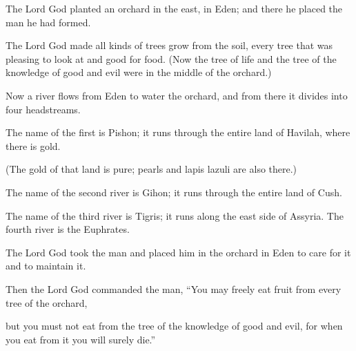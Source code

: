 \begin{scripture}
 The Lord God planted an orchard in the east, in Eden; and there he placed the man he had formed.
 The Lord God made all kinds of trees grow from the soil, every tree that was pleasing to look at and good for food. (Now the tree of life and the tree of the knowledge of good and evil were in the middle of the orchard.)
\everypar{}

 Now a river flows from Eden to water the orchard, and from there it divides into four headstreams.
 The name of the first is Pishon; it runs through the entire land of Havilah, where there is gold.
 (The gold of that land is pure; pearls and lapis lazuli are also there.)
 The name of the second river is Gihon; it runs through the entire land of Cush.
 The name of the third river is Tigris; it runs along the east side of Assyria. The fourth river is the Euphrates.
\everypar{}

 The Lord God took the man and placed him in the orchard in Eden to care for it and to maintain it.
 Then the Lord God commanded the man, ``You may freely eat fruit from every tree of the orchard,
 but you must not eat from the tree of the knowledge of good and evil, for when you eat from it you will surely die.''
\everypar{}


\end{scripture}
